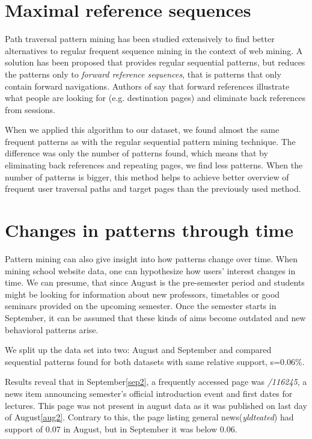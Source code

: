 \documentclass[12pt, english,a4paper]{article}
\begin{document}
\section{Maximal reference sequences}
Path traversal pattern mining has been studied extensively to find better alternatives to regular frequent sequence mining in the context of web mining. A solution has been proposed \cite{path_patterns} that provides regular sequential patterns, but reduces the patterns only to \emph{forward reference sequences}, that is patterns that only contain forward navigations. Authors of \cite{path_patterns} say that forward references illustrate what people are looking for (e.g. destination pages) and eliminate back references from sessions.

When we applied this algorithm to our dataset, we found almost the same frequent patterns as with the regular sequential pattern mining technique. The difference was only the number of patterns found, which means that by eliminating back references and repeating pages, we find less patterns. When the number of patterns is bigger, this method helps to achieve better overview of frequent user traversal paths and target pages than the previously used method.

\section{Changes in patterns through time} 
Pattern mining can also give insight into how patterns change over time. When mining school website data, one can hypothesize how users' interest changes in time. We can presume, that since August is the pre-semester period and students might be looking for information about new professors, timetables or good seminars provided on the upcoming semester. Once the semester starts in September, it can be assumed that these kinds of aims become outdated and new behavioral patterns arise.

We split up the data set into two: August and September and compared sequential patterns found for both datasets with same relative support, s=$0.06\%$.

Results reveal that in September\ref{sep2}, a frequently accessed page was \emph{/116245}, a news item announcing semester's official introduction event and first dates for lectures. This page was not present in august data as it was published on last day of August\ref{aug2}. Contrary to this, the page listing general news(\emph{yldteated}) had support of $0.07$ in August, but in September it was below $0.06$. 
\end{document}
